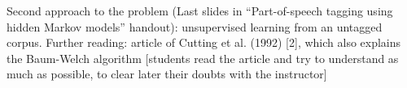 Second approach to the problem (Last slides in “Part-of-speech tagging using hidden Markov models” handout): unsupervised learning from an untagged corpus. Further reading: article of Cutting et al. (1992) [2], which also explains the Baum-Welch algorithm [students read the article and try to understand as much as possible, to clear later their doubts with the instructor]






